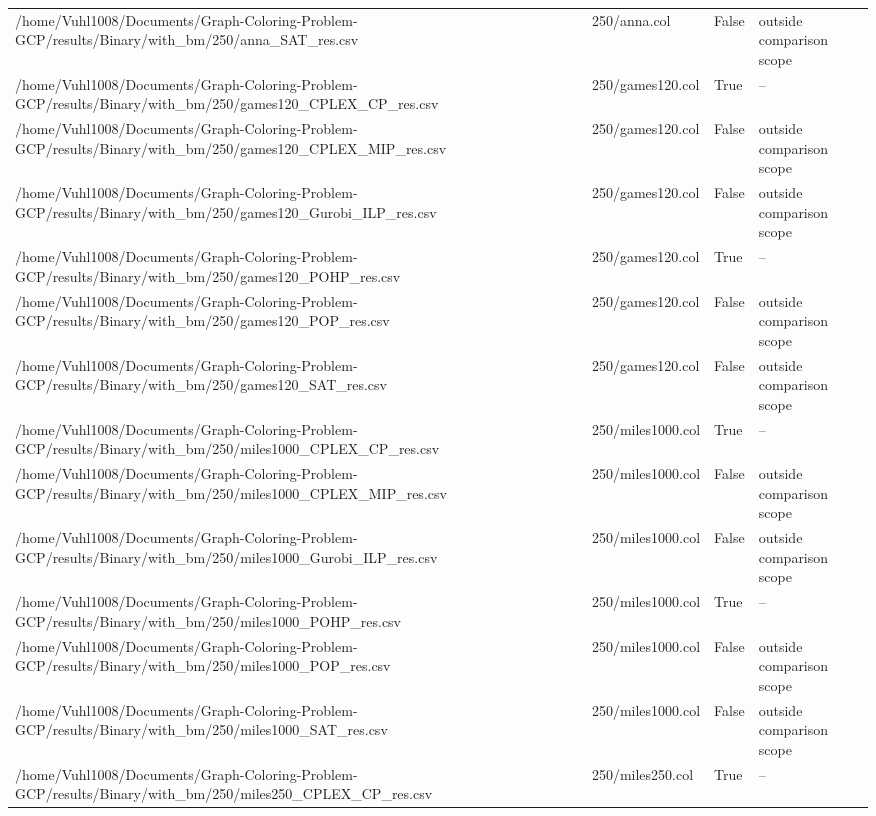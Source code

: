 \begin{table}[htbp]
\begin{tabular}{llll}
/home/Vuhl1008/Documents/Graph-Coloring-Problem-GCP/results/Binary/with\_bm/250/anna\_SAT\_res.csv & 250/anna.col & False & outside comparison scope \\
/home/Vuhl1008/Documents/Graph-Coloring-Problem-GCP/results/Binary/with\_bm/250/games120\_CPLEX\_CP\_res.csv & 250/games120.col & True & -- \\
/home/Vuhl1008/Documents/Graph-Coloring-Problem-GCP/results/Binary/with\_bm/250/games120\_CPLEX\_MIP\_res.csv & 250/games120.col & False & outside comparison scope \\
/home/Vuhl1008/Documents/Graph-Coloring-Problem-GCP/results/Binary/with\_bm/250/games120\_Gurobi\_ILP\_res.csv & 250/games120.col & False & outside comparison scope \\
/home/Vuhl1008/Documents/Graph-Coloring-Problem-GCP/results/Binary/with\_bm/250/games120\_POHP\_res.csv & 250/games120.col & True & -- \\
/home/Vuhl1008/Documents/Graph-Coloring-Problem-GCP/results/Binary/with\_bm/250/games120\_POP\_res.csv & 250/games120.col & False & outside comparison scope \\
/home/Vuhl1008/Documents/Graph-Coloring-Problem-GCP/results/Binary/with\_bm/250/games120\_SAT\_res.csv & 250/games120.col & False & outside comparison scope \\
/home/Vuhl1008/Documents/Graph-Coloring-Problem-GCP/results/Binary/with\_bm/250/miles1000\_CPLEX\_CP\_res.csv & 250/miles1000.col & True & -- \\
/home/Vuhl1008/Documents/Graph-Coloring-Problem-GCP/results/Binary/with\_bm/250/miles1000\_CPLEX\_MIP\_res.csv & 250/miles1000.col & False & outside comparison scope \\
/home/Vuhl1008/Documents/Graph-Coloring-Problem-GCP/results/Binary/with\_bm/250/miles1000\_Gurobi\_ILP\_res.csv & 250/miles1000.col & False & outside comparison scope \\
/home/Vuhl1008/Documents/Graph-Coloring-Problem-GCP/results/Binary/with\_bm/250/miles1000\_POHP\_res.csv & 250/miles1000.col & True & -- \\
/home/Vuhl1008/Documents/Graph-Coloring-Problem-GCP/results/Binary/with\_bm/250/miles1000\_POP\_res.csv & 250/miles1000.col & False & outside comparison scope \\
/home/Vuhl1008/Documents/Graph-Coloring-Problem-GCP/results/Binary/with\_bm/250/miles1000\_SAT\_res.csv & 250/miles1000.col & False & outside comparison scope \\
/home/Vuhl1008/Documents/Graph-Coloring-Problem-GCP/results/Binary/with\_bm/250/miles250\_CPLEX\_CP\_res.csv & 250/miles250.col & True & -- \\

\end{tabular}
\end{table}
